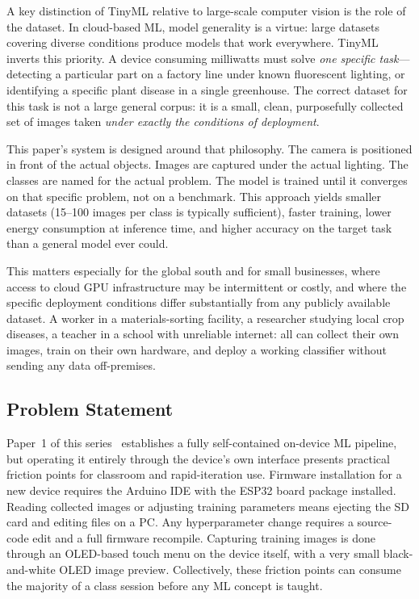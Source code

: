 \documentclass[11pt]{article}
\begin{document}
A key distinction of TinyML relative to large-scale computer vision is the role of
the dataset. In cloud-based ML, model generality is a virtue: large datasets covering
diverse conditions produce models that work everywhere. TinyML inverts this priority.
A device consuming milliwatts must solve \emph{one specific task}---detecting a
particular part on a factory line under known fluorescent lighting, or identifying
a specific plant disease in a single greenhouse. The correct dataset for this task
is not a large general corpus: it is a small, clean, purposefully collected set of
images taken \emph{under exactly the conditions of deployment}.

This paper's system is designed around that philosophy. The camera is positioned
in front of the actual objects. Images are captured under the actual lighting. The
classes are named for the actual problem. The model is trained until it converges
on that specific problem, not on a benchmark. This approach yields smaller datasets
(15--100 images per class is typically sufficient), faster training, lower energy
consumption at inference time, and higher accuracy on the target task than a
general model ever could.

This matters especially for the global south and for small businesses, where access
to cloud GPU infrastructure may be intermittent or costly, and where the specific
deployment conditions differ substantially from any publicly available dataset. A
worker in a materials-sorting facility, a researcher studying local crop diseases,
a teacher in a school with unreliable internet: all can collect their own images,
train on their own hardware, and deploy a working classifier without sending any
data off-premises.

\subsection{Problem Statement}

Paper~1 of this series~\cite{ellis2026ondevice} establishes a fully self-contained
on-device ML pipeline, but operating it entirely through the device's own interface
presents practical friction points for classroom and rapid-iteration use. Firmware
installation for a new device requires the Arduino IDE with the ESP32 board package
installed. Reading collected images or adjusting training parameters means
ejecting the SD card and editing files on a PC. Any hyperparameter change requires a
source-code edit and a full firmware recompile. Capturing
training images is done through an OLED-based touch menu on the device itself, with
a very small black-and-white OLED image preview. Collectively, these friction points can consume
the majority of a class session before any ML concept is taught.
\end{document}
